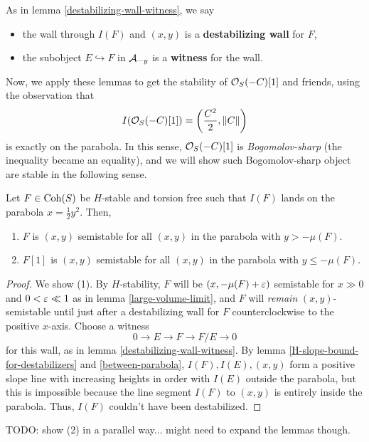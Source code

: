 \documentclass[12pt]{article}
\begin{document}
\begin{defn}
    As in lemma \ref{destabilizing-wall-witness}, we say
    \begin{itemize}
        \item the wall through $I(F)$ and $(x,y)$ is a \textbf{destabilizing wall} for $F$,
        \item the subobject $E\hookrightarrow F$ in $\mathcal{A}_{-y}$ is a \textbf{witness} for the wall.
    \end{itemize}
\end{defn}

Now, we apply these lemmas to get the stability of $\mathcal{O}_S(-C)[1]$ and friends, using the observation that
\[I(\mathcal{O}_S(-C)[1]) = \left(\frac{C^2}{2}, \|C\|\right)\]
is exactly on the parabola. In this sense, $\mathcal{O}_S(-C)[1]$ is \textit{Bogomolov-sharp} (the inequality became an equality), and we will show such Bogomolov-sharp object are stable in the following sense.

\begin{prop}
    Let $F\in \operatorname{Coh}(S)$ be $H$-stable and torsion free such that $I(F)$ lands on the parabola $x=\frac{1}{2}y^2$. Then,
    \begin{enumerate}[label=(\arabic*)]
        \item $F$ is $(x,y)$ semistable for all $(x,y)$ in the parabola with $y>-\mu(F)$.
        \item $F[1]$ is $(x,y)$ semistable for all $(x,y)$ in the parabola with $y\leq -\mu(F)$.
    \end{enumerate}
\end{prop}

\begin{proof}
    We show (1). By $H$-stability, $F$ will be $(x,-\mu(F)+\varepsilon)$ semistable for $x\gg 0$ and $0<\varepsilon \ll 1$ as in lemma \ref{large-volume-limit}, and $F$ will \textit{remain} $(x,y)$-semistable until just after a destabilizing wall for $F$ counterclockwise to the positive $x$-axis. Choose a witness
    \[0\to E \to F \to F/E \to 0\]
    for this wall, as in lemma \ref{destabilizing-wall-witness}. By lemma \ref{H-slope-bound-for-destabilizers} and \ref{between-parabola}, $I(F), I(E), (x,y)$ form a positive slope line with increasing heights in order with $I(E)$ outside the parabola, but this is impossible because the line segment $I(F)$ to $(x,y)$ is entirely inside the parabola. Thus, $I(F)$ couldn't have been destabilized.
\end{proof}

{\color{red} TODO: show (2) in a parallel way... might need to expand the lemmas though.}
\end{document}
